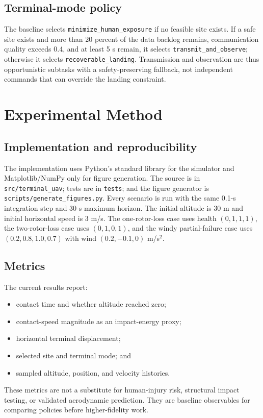 \documentclass[conference]{IEEEtran}
\begin{document}
\subsection{Terminal-mode policy}
The baseline selects \texttt{minimize\_human\_exposure} if no feasible site
exists. If a safe site exists and more than 20 percent of the data backlog
remains, communication quality exceeds 0.4, and at least 5 s remain, it
selects \texttt{transmit\_and\_observe}; otherwise it selects
\texttt{recoverable\_landing}. Transmission and observation are thus
opportunistic subtasks with a safety-preserving fallback, not independent
commands that can override the landing constraint.

\section{Experimental Method}
\subsection{Implementation and reproducibility}
The implementation uses Python's standard library for the simulator and
Matplotlib/NumPy only for figure generation. The source is in
\texttt{src/terminal\_uav}; tests are in \texttt{tests}; and the figure
generator is \texttt{scripts/generate\_figures.py}. Every scenario is run
with the same 0.1-s integration step and 30-s maximum horizon. The initial
altitude is 30 m and initial horizontal speed is 3 m/s. The one-rotor-loss
case uses health $(0,1,1,1)$, the two-rotor-loss case uses $(0,1,0,1)$, and
the windy partial-failure case uses $(0.2,0.8,1.0,0.7)$ with wind
$(0.2,-0.1,0)$ m/s$^2$.

\subsection{Metrics}
The current results report:
\begin{itemize}
\item contact time and whether altitude reached zero;
\item contact-speed magnitude as an impact-energy proxy;
\item horizontal terminal displacement;
\item selected site and terminal mode; and
\item sampled altitude, position, and velocity histories.
\end{itemize}
These metrics are not a substitute for human-injury risk, structural impact
testing, or validated aerodynamic prediction. They are baseline observables
for comparing policies before higher-fidelity work.
\end{document}
